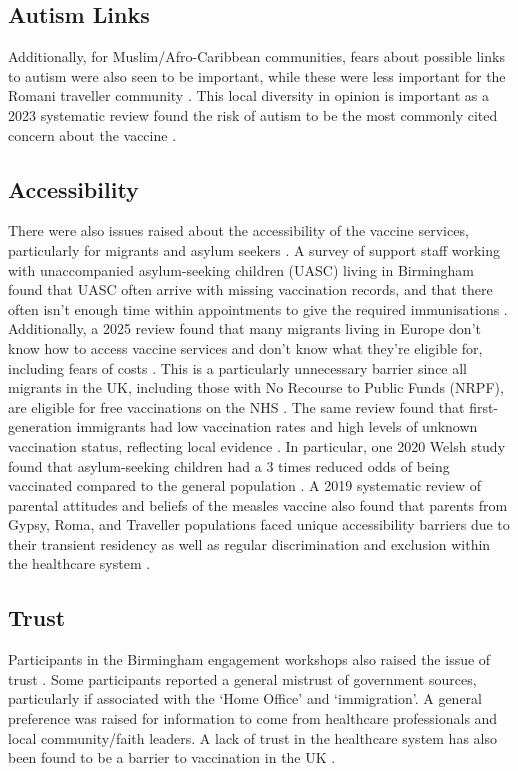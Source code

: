 \documentclass{article}
\begin{document}
\subsection{Autism Links}
Additionally, for Muslim/Afro-Caribbean communities, fears about possible links to autism were also seen to be important, while these were less important for the Romani traveller community \cite{palmer_birmingham_measles_engagement_2024, smbc_community_engagement_learning_2025}. This local diversity in opinion is important as a 2023 systematic review found the risk of autism to be the most commonly cited concern about the vaccine \cite{novilla2023parents}.

\subsection{Accessibility}
There were also issues raised about the accessibility of the vaccine services, particularly for migrants and asylum seekers
\cite{bissett_measles_soft_intelligence_2024}. A survey of support staff working with unaccompanied asylum-seeking children (UASC) living in Birmingham found that UASC often arrive with missing vaccination records, and that there often isn’t enough time within appointments to give the required immunisations \cite{kemishi_uasc_health_wellbeing_2025}. Additionally, a 2025 review found that many migrants living in Europe don’t know how to access vaccine services and don’t know what they’re eligible for, including fears of costs \cite{halliday2025vaccine}. This is a particularly unnecessary barrier since all migrants in the UK, including those with No Recourse to Public Funds (NRPF), are eligible for free vaccinations on the NHS \cite{nrpf_nhs_treatment_overview, ukhsa_migrant_immunisation_2022}. The same review found that first-generation immigrants had low vaccination rates and high levels of unknown vaccination status, reflecting local evidence \cite{halliday2025vaccine}. In particular, one 2020 Welsh study found that asylum-seeking children had a 3 times reduced odds of being vaccinated compared to the general population \cite{perry2020inequalities}. A 2019 systematic review of parental attitudes and beliefs of the measles vaccine also found that parents from Gypsy, Roma, and Traveller populations faced unique accessibility barriers due to their transient residency as well as regular discrimination and exclusion within the healthcare system \cite{wilder2020resurgence}.

\subsection{Trust}
Participants in the Birmingham engagement workshops also raised the issue of trust \cite{bissett_measles_soft_intelligence_2024, palmer_birmingham_measles_engagement_2024}. Some participants reported a general mistrust of government sources, particularly if associated with the ‘Home Office’ and ‘immigration’. A general preference was raised for information to come from healthcare professionals and local community/faith leaders. A lack of trust in the healthcare system has also been found to be a barrier to vaccination in the UK \cite{torracinta2021mmr}.
\end{document}
